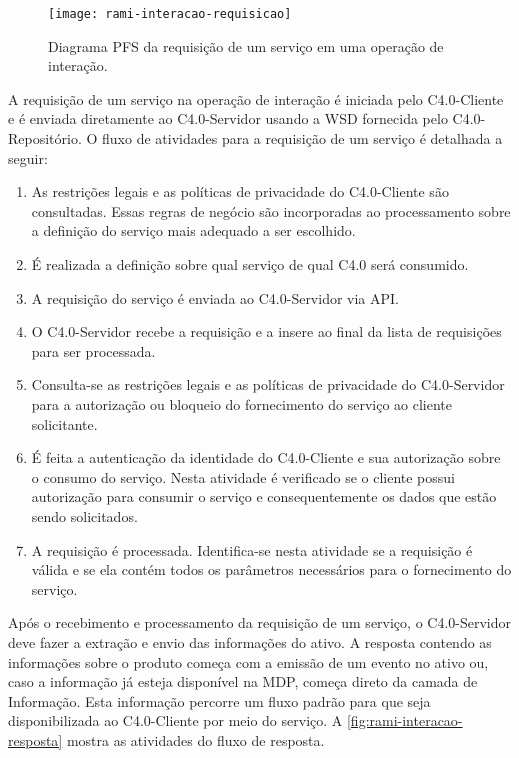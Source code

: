 	\begin{figure}[htb]
		\centering
		\caption{Diagrama PFS da requisição de um serviço em uma operação de interação.}
		\label{fig:rami-interacao-requisicao}
		\texttt{[image: rami-interacao-requisicao]}
	\end{figure}

	A requisição de um serviço na operação de interação é iniciada pelo C4.0-Cliente e é enviada diretamente ao C4.0-Servidor usando a WSD fornecida pelo C4.0-Repositório. O fluxo de atividades para a requisição de um serviço é detalhada a seguir:
	
	\begin{enumerate}
		
		\item As restrições legais e as políticas de privacidade do C4.0-Cliente são consultadas. Essas regras de negócio são incorporadas ao processamento sobre a definição do serviço mais adequado a ser escolhido.
		
		\item É realizada a definição sobre qual serviço de qual C4.0 será consumido.
		
		\item A requisição do serviço é enviada ao C4.0-Servidor via API.
		
		\item O C4.0-Servidor recebe a requisição e a insere ao final da lista de requisições para ser processada.
		
		\item Consulta-se as restrições legais e as políticas de privacidade do C4.0-Servidor para a autorização ou bloqueio do fornecimento do serviço ao cliente solicitante.
		
		\item É feita a autenticação da identidade do C4.0-Cliente e sua autorização sobre o consumo do serviço. Nesta atividade é verificado se o cliente possui autorização para consumir o serviço e consequentemente os dados que estão sendo solicitados.
		
		\item A requisição é processada. Identifica-se nesta atividade se a requisição é válida e se ela contém todos os parâmetros necessários para o fornecimento do serviço.

	\end{enumerate}

	Após o recebimento e processamento da requisição de um serviço, o C4.0-Servidor deve fazer a extração e envio das informações do ativo. A resposta contendo as informações sobre o produto começa com a emissão de um evento no ativo ou, caso a informação já esteja disponível na MDP, começa direto da camada de Informação. Esta informação percorre um fluxo padrão para que seja disponibilizada ao C4.0-Cliente por meio do serviço. A \autoref{fig:rami-interacao-resposta} mostra as atividades do fluxo de resposta.

